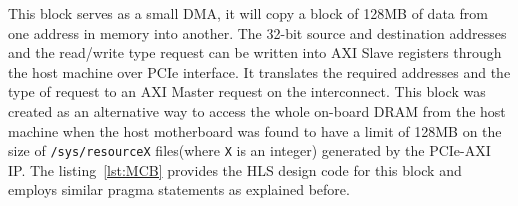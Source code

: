 This block serves as a small DMA, it will copy a block of 128MB of data from one address in memory into another. The 32-bit source and
destination addresses and the read/write type request can be written into AXI Slave registers through the host machine over PCIe interface.
It translates the required addresses and the type of request to an AXI Master request on the interconnect. This block was created as an
alternative way to access the whole on-board DRAM from the host machine when the host motherboard was found to have a limit of 128MB on the
size of \verb|/sys/resourceX| files(where \verb|X| is an integer) generated by the PCIe-AXI IP. The listing~\ref{lst:MCB} provides the HLS
design code for this block and employs similar pragma statements as explained before.


